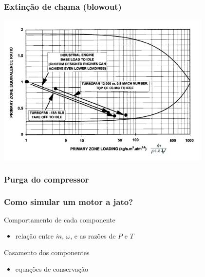 \documentclass[aspectratio=1610]{beamer}
\begin{document}
\begin{frame}
    \frametitle{Extinção de chama (blowout)}
        \begin{center}
        \includegraphics[height=3in]{fig/combustion_stability}
        \end{center}
        \vspace{-1em}
        {\scriptsize\cite{walsh2004gas}}
\end{frame}

{
\begin{frame}
    \frametitle{Purga do compressor}
    \centering
\end{frame}
}

\begin{frame}
    \frametitle{Como simular um motor a jato?}
     Comportamento de cada componente
            \begin{itemize}
                \item relação entre $\dot{m}$, $\omega$, e as razões de $P$ e  $T$
            \end{itemize}
            \vspace{1em}
     Casamento dos componentes
            \begin{itemize}
                \item equações de conservação
            \end{itemize}

\end{frame}
\end{document}
